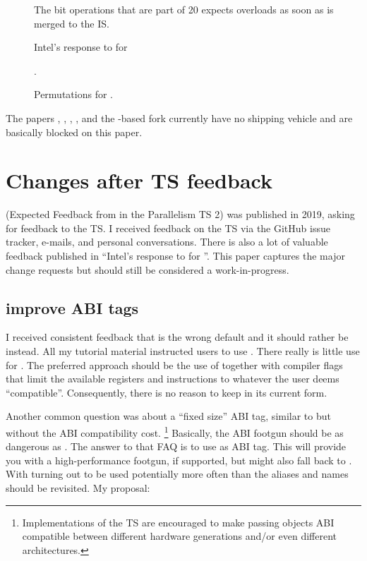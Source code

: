 \begin{description}
  \item[] The bit operations that are part of \CC{}20 expects  overloads as soon as  is merged to the IS.

  \item[] Intel’s response to  for 

  \item[] .

  \item[] Permutations for .

\end{description}
The papers , , , , and
the -based  fork currently have no shipping vehicle
and are basically blocked on this paper.

\section{Changes after TS feedback}\label{sec:changes}
\cite{P1915R0} (Expected Feedback from  in the Parallelism TS 2) was published in 2019, asking for feedback to the TS.
I received feedback on the TS via the GitHub issue tracker, e-mails, and personal conversations.
There is also a lot of valuable feedback published in  ``Intel’s response to  for ''.
This paper captures the major change requests but should still be considered a work-in-progress.

\subsection{improve ABI tags}
I received consistent feedback that \simdabi{} is the wrong default and it should rather be \simdabi{} instead.
All my tutorial material instructed users to use \stdx{}.
There really is little use for \simdabi{}.
The preferred approach should be the use of \simdabi{} together with compiler flags that limit the available registers and instructions to whatever the user deems “compatible”.
Consequently, there is no reason to keep \simdabi{} in its current form.

Another common question was about a “fixed size” ABI tag, similar to \stdx\simdabi{} but without the ABI compatibility cost.%
\footnote{Implementations of the TS are encouraged to make passing  objects ABI compatible between different hardware generations and/or even different architectures.}
Basically, the ABI footgun should be as dangerous as \stdx\simdabi{}.
The answer to that FAQ is to use \stdx\simdabi{} as ABI tag.
This will provide you with a high-performance footgun, if supported, but might also fall back to \stdx\simdabi{}.
With \stdx\simdabi{} turning out to be used potentially more often than \stdx\simdabi{} the aliases and names should be revisited.
My proposal:

